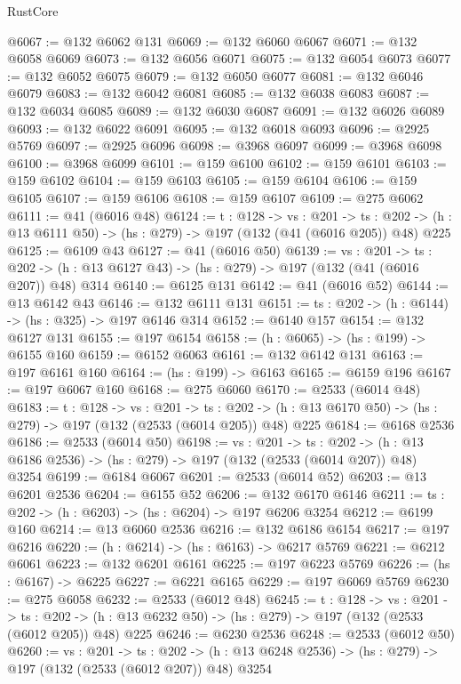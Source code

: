 \begin{lexlean}{RustCore}
\begin{coremodule}
@6067 := @132 @6062 @131
@6069 := @132 @6060 @6067
@6071 := @132 @6058 @6069
@6073 := @132 @6056 @6071
@6075 := @132 @6054 @6073
@6077 := @132 @6052 @6075
@6079 := @132 @6050 @6077
@6081 := @132 @6046 @6079
@6083 := @132 @6042 @6081
@6085 := @132 @6038 @6083
@6087 := @132 @6034 @6085
@6089 := @132 @6030 @6087
@6091 := @132 @6026 @6089
@6093 := @132 @6022 @6091
@6095 := @132 @6018 @6093
@6096 := @2925 @5769
@6097 := @2925 @6096
@6098 := @3968 @6097
@6099 := @3968 @6098
@6100 := @3968 @6099
@6101 := @159 @6100
@6102 := @159 @6101
@6103 := @159 @6102
@6104 := @159 @6103
@6105 := @159 @6104
@6106 := @159 @6105
@6107 := @159 @6106
@6108 := @159 @6107
@6109 := @275 @6062
@6111 := @41 (@6016 @48)
@6124 := {t : @128} ->
  {vs : @201} ->
  {ts : @202} -> (h : @13 @6111 @50) -> (hs : @279) -> @197 (@132 (@41 (@6016 @205)) @48) @225
@6125 := @6109 @43
@6127 := @41 (@6016 @50)
@6139 := {vs : @201} ->
  {ts : @202} -> (h : @13 @6127 @43) -> (hs : @279) -> @197 (@132 (@41 (@6016 @207)) @48) @314
@6140 := @6125 @131
@6142 := @41 (@6016 @52)
@6144 := @13 @6142 @43
@6146 := @132 @6111 @131
@6151 := {ts : @202} -> (h : @6144) -> (hs : @325) -> @197 @6146 @314
@6152 := @6140 @157
@6154 := @132 @6127 @131
@6155 := @197 @6154
@6158 := (h : @6065) -> (hs : @199) -> @6155 @160
@6159 := @6152 @6063
@6161 := @132 @6142 @131
@6163 := @197 @6161 @160
@6164 := (hs : @199) -> @6163
@6165 := @6159 @196
@6167 := @197 @6067 @160
@6168 := @275 @6060
@6170 := @2533 (@6014 @48)
@6183 := {t : @128} ->
  {vs : @201} ->
  {ts : @202} -> (h : @13 @6170 @50) -> (hs : @279) -> @197 (@132 (@2533 (@6014 @205)) @48) @225
@6184 := @6168 @2536
@6186 := @2533 (@6014 @50)
@6198 := {vs : @201} ->
  {ts : @202} -> (h : @13 @6186 @2536) -> (hs : @279) -> @197 (@132 (@2533 (@6014 @207)) @48) @3254
@6199 := @6184 @6067
@6201 := @2533 (@6014 @52)
@6203 := @13 @6201 @2536
@6204 := @6155 @52
@6206 := @132 @6170 @6146
@6211 := {ts : @202} -> (h : @6203) -> (hs : @6204) -> @197 @6206 @3254
@6212 := @6199 @160
@6214 := @13 @6060 @2536
@6216 := @132 @6186 @6154
@6217 := @197 @6216
@6220 := (h : @6214) -> (hs : @6163) -> @6217 @5769
@6221 := @6212 @6061
@6223 := @132 @6201 @6161
@6225 := @197 @6223 @5769
@6226 := (hs : @6167) -> @6225
@6227 := @6221 @6165
@6229 := @197 @6069 @5769
@6230 := @275 @6058
@6232 := @2533 (@6012 @48)
@6245 := {t : @128} ->
  {vs : @201} ->
  {ts : @202} -> (h : @13 @6232 @50) -> (hs : @279) -> @197 (@132 (@2533 (@6012 @205)) @48) @225
@6246 := @6230 @2536
@6248 := @2533 (@6012 @50)
@6260 := {vs : @201} ->
  {ts : @202} -> (h : @13 @6248 @2536) -> (hs : @279) -> @197 (@132 (@2533 (@6012 @207)) @48) @3254

\end{coremodule}
\end{lexlean}
